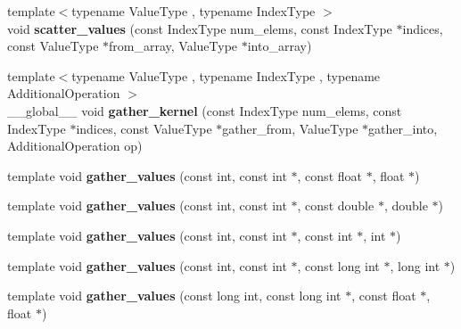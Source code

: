 \begin{DoxyCompactItemize}
\item 
\mbox{\label{namespaceschwz_a8e9cee5617c5c8270b831925ea4e6575}} 
{\footnotesize template$<$typename Value\+Type , typename Index\+Type $>$ }\\void {\bfseries scatter\+\_\+values} (const Index\+Type num\+\_\+elems, const Index\+Type $\ast$indices, const Value\+Type $\ast$from\+\_\+array, Value\+Type $\ast$into\+\_\+array)
\item 
\mbox{\label{namespaceschwz_a5e68ca208e6176c2ba8f7da99786bd75}} 
{\footnotesize template$<$typename Value\+Type , typename Index\+Type , typename Additional\+Operation $>$ }\\\+\_\+\+\_\+global\+\_\+\+\_\+ void {\bfseries gather\+\_\+kernel} (const Index\+Type num\+\_\+elems, const Index\+Type $\ast$indices, const Value\+Type $\ast$gather\+\_\+from, Value\+Type $\ast$gather\+\_\+into, Additional\+Operation op)
\item 
\mbox{\label{namespaceschwz_a7ab38225d7d861d19a8832cfffb7efe5}} 
template void {\bfseries gather\+\_\+values} (const int, const int $\ast$, const float $\ast$, float $\ast$)
\item 
\mbox{\label{namespaceschwz_aa6c2935754fee8a672b1ead7a7ca0fe3}} 
template void {\bfseries gather\+\_\+values} (const int, const int $\ast$, const double $\ast$, double $\ast$)
\item 
\mbox{\label{namespaceschwz_a4bed0b908c287eb731936d0fcece6c6e}} 
template void {\bfseries gather\+\_\+values} (const int, const int $\ast$, const int $\ast$, int $\ast$)
\item 
\mbox{\label{namespaceschwz_aab13b4ded1cd7a8c5bd9e738035c36e6}} 
template void {\bfseries gather\+\_\+values} (const int, const int $\ast$, const long int $\ast$, long int $\ast$)
\item 
\mbox{\label{namespaceschwz_a758923b00d860044630d1b5cd4c4235a}} 
template void {\bfseries gather\+\_\+values} (const long int, const long int $\ast$, const float $\ast$, float $\ast$)
\item 
\mbox{\label{namespaceschwz_a71821c9bb49d9dc02bcdad25f414bf35}} 

\end{DoxyCompactItemize}
